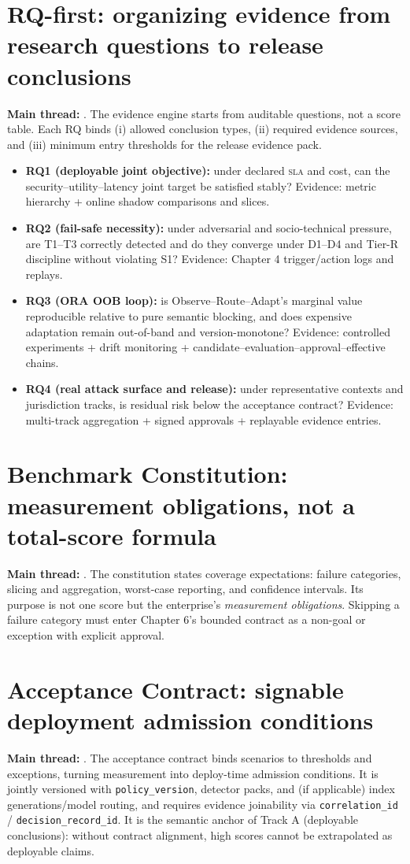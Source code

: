 \documentclass[11pt,a4paper]{report}
\begin{document}
\section{RQ-first: organizing evidence from research questions to release conclusions}
\textbf{Main thread:} \EvalFramework{}. The evidence engine starts from auditable questions, not a score table. Each RQ binds (i) allowed conclusion types, (ii) required evidence sources, and (iii) minimum entry thresholds for the release evidence pack.
\begin{itemize}
  \item \textbf{RQ1 (deployable joint objective):} under declared \textsc{sla} and cost, can the security–utility–latency joint target be satisfied stably? Evidence: metric hierarchy + online shadow comparisons and slices.
  \item \textbf{RQ2 (fail-safe necessity):} under adversarial and socio-technical pressure, are T1--T3 correctly detected and do they converge under D1--D4 and Tier-R discipline without violating S1? Evidence: Chapter 4 trigger/action logs and replays.
  \item \textbf{RQ3 (ORA OOB loop):} is Observe--Route--Adapt’s marginal value reproducible relative to pure semantic blocking, and does expensive adaptation remain out-of-band and version-monotone? Evidence: controlled experiments + drift monitoring + candidate–evaluation–approval–effective chains.
  \item \textbf{RQ4 (real attack surface and release):} under representative contexts and jurisdiction tracks, is residual risk below the acceptance contract? Evidence: multi-track aggregation + signed approvals + replayable evidence entries.
\end{itemize}

\section{Benchmark Constitution: measurement obligations, not a total-score formula}
\textbf{Main thread:} \EvalFramework{}. The constitution states coverage expectations: failure categories, slicing and aggregation, worst-case reporting, and confidence intervals. Its purpose is not one score but the enterprise’s \emph{measurement obligations}. Skipping a failure category must enter Chapter 6’s bounded contract as a non-goal or exception with explicit approval.

\section{Acceptance Contract: signable deployment admission conditions}
\textbf{Main thread:} \EvalFramework{}. The acceptance contract binds scenarios to thresholds and exceptions, turning measurement into deploy-time admission conditions. It is jointly versioned with \texttt{policy\_version}, detector packs, and (if applicable) index generations/model routing, and requires evidence joinability via \texttt{correlation\_id} / \texttt{decision\_record\_id}. It is the semantic anchor of Track A (deployable conclusions): without contract alignment, high scores cannot be extrapolated as deployable claims.
\end{document}
